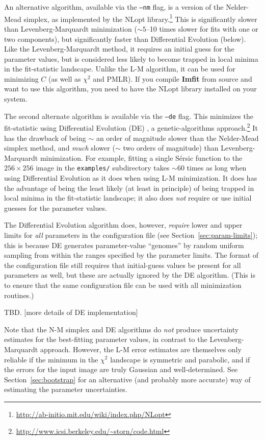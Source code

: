 \documentclass[10pt,a4paper,article]{memoir}
\newcommand{\imfit}{\textbf{Imfit}}
\newcommand{\chisquare}{\ensuremath{\chi^{2}}}
\newcommand{\pmlr}{PMLR}
\begin{document}
An alternative algorithm, available via the \texttt{--nm} flag,  is a
version of the Nelder-Mead simplex, as implemented by the NLopt
library.\footnote{\url{http://ab-initio.mit.edu/wiki/index.php/NLopt}}
This is significantly slower than Levenberg-Marquardt minimization
($\sim 5$--10 times slower for fits with one or two components), but
significantly faster than Differential Evolution (below). Like the
Levenberg-Marquardt method, it requires an initial guess for the
parameter values, but is considered less likely to become trapped in
local minima in the fit-statistic landscape. Unlike the L-M algorithm,
it can be used for minimizing $C$ (as well as \chisquare{} and
\pmlr). If you compile \imfit{} from source and want to use
this algorithm, you need to have the NLopt library installed on your
system.

The second alternate algorithm is available via the \texttt{--de} flag.
This minimizes the fit-statistic using Differential Evolution (DE)
\citep{de}, a genetic-algorithms
approach.\footnote{\url{http://www.icsi.berkeley.edu/~storn/code.html}}
It has the drawback of being $\sim$ an order of magnitude slower than
the Nelder-Mead simplex method, and \textit{much} slower ($\sim$ two
orders of magnitude) than Levenberg-Marquardt minimization. For example,
fitting a single S\'ersic function to the $256 \times 256$ image in the
\texttt{examples/} subdirectory takes $\sim 60$ times as long when using
Differential Evolution as it does when using L-M minimization. It does
has the advantage of being the least likely (at least in principle) of
being trapped in local minima in the fit-statistic landscape; it also
does \textit{not} require or use initial guesses for the parameter values.

The Differential Evolution algorithm does, however, \textit{require}
lower and upper limits for \textit{all} parameters in the configuration
file (see Section~\ref{sec:param-limits}); this is because DE generates
parameter-value ``genomes'' by random uniform sampling from within the
ranges specified by the parameter limits. The format of the
configuration file still requires that initial-guess values be present
for all parameters as well, but these are actually ignored by the DE
algorithm. (This is to ensure that the same configuration file can be
used with all minimization routines.)


\medskip

TBD. [more details of DE implementation]

\medskip

Note that the N-M simplex and DE algorithms do \textit{not} produce uncertainty
estimates for the best-fitting parameter values, in contrast to the
Levenberg-Marquardt approach. However, the L-M error estimates are themselves
only reliable if the minimum in the \chisquare{} landscape is symmetric and
parabolic, and if the errors for the input image are truly Gaussian and
well-determined.  See Section~\ref{sec:bootstrap} for an alternative (and probably
more accurate) way of estimating the parameter uncertainties.
\end{document}
